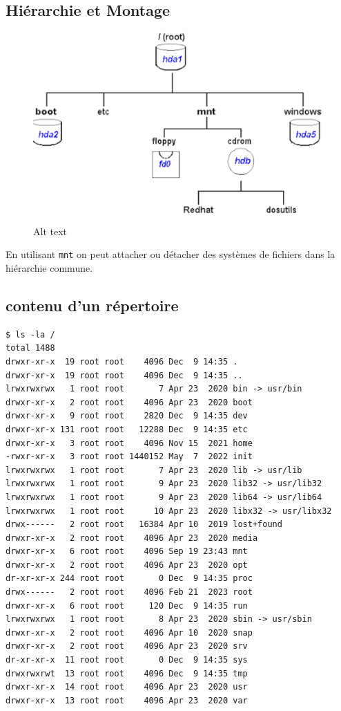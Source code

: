 \subsection{Hiérarchie et Montage}\label{hiuxe9rarchie-et-montage}

\begin{figure}
\centering
\includegraphics{image-34.png}
\caption{Alt text}
\end{figure}

En utilisant \texttt{mnt} on peut attacher ou détacher des systèmes de
fichiers dans la hiérarchie commune.

\subsection{contenu d'un répertoire}\label{contenu-dun-ruxe9pertoire}

\begin{verbatim}
$ ls -la / 
total 1488
drwxr-xr-x  19 root root    4096 Dec  9 14:35 .
drwxr-xr-x  19 root root    4096 Dec  9 14:35 ..
lrwxrwxrwx   1 root root       7 Apr 23  2020 bin -> usr/bin
drwxr-xr-x   2 root root    4096 Apr 23  2020 boot
drwxr-xr-x   9 root root    2820 Dec  9 14:35 dev
drwxr-xr-x 131 root root   12288 Dec  9 14:35 etc
drwxr-xr-x   3 root root    4096 Nov 15  2021 home
-rwxr-xr-x   3 root root 1440152 May  7  2022 init
lrwxrwxrwx   1 root root       7 Apr 23  2020 lib -> usr/lib
lrwxrwxrwx   1 root root       9 Apr 23  2020 lib32 -> usr/lib32
lrwxrwxrwx   1 root root       9 Apr 23  2020 lib64 -> usr/lib64
lrwxrwxrwx   1 root root      10 Apr 23  2020 libx32 -> usr/libx32
drwx------   2 root root   16384 Apr 10  2019 lost+found
drwxr-xr-x   2 root root    4096 Apr 23  2020 media
drwxr-xr-x   6 root root    4096 Sep 19 23:43 mnt
drwxr-xr-x   2 root root    4096 Apr 23  2020 opt
dr-xr-xr-x 244 root root       0 Dec  9 14:35 proc
drwx------   2 root root    4096 Feb 21  2023 root
drwxr-xr-x   6 root root     120 Dec  9 14:35 run
lrwxrwxrwx   1 root root       8 Apr 23  2020 sbin -> usr/sbin
drwxr-xr-x   2 root root    4096 Apr 10  2020 snap
drwxr-xr-x   2 root root    4096 Apr 23  2020 srv
dr-xr-xr-x  11 root root       0 Dec  9 14:35 sys
drwxrwxrwt  13 root root    4096 Dec  9 14:35 tmp
drwxr-xr-x  14 root root    4096 Apr 23  2020 usr
drwxr-xr-x  13 root root    4096 Apr 23  2020 var
\end{verbatim}

